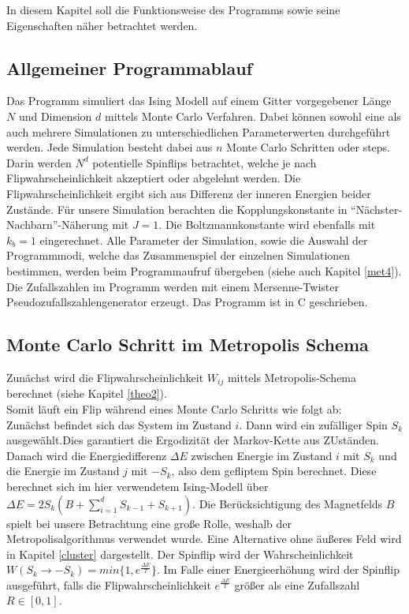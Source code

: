 
In diesem Kapitel soll die Funktionsweise des Programms sowie seine Eigenschaften näher betrachtet werden.


\subsection{Allgemeiner Programmablauf}

Das Programm simuliert das Ising Modell auf einem Gitter vorgegebener Länge $N$ und Dimension $d$ mittels Monte Carlo Verfahren. Dabei können sowohl eine als auch mehrere Simulationen zu unterschiedlichen Parameterwerten durchgeführt werden. Jede Simulation besteht dabei aus $n$ Monte Carlo Schritten oder steps. Darin werden $N^{d}$ potentielle Spinflips betrachtet, welche je nach Flipwahrscheinlichkeit akzeptiert oder abgelehnt werden. Die Flipwahrscheinlichkeit ergibt sich aus Differenz der inneren Energien beider Zustände. Für unsere Simulation berachten die Kopplungskonstante in “Nächster-Nachbarn”-Näherung mit $J=1$. Die Boltzmannkonstante wird ebenfalls mit $k_{b}=1$ eingerechnet. 
Alle Parameter der Simulation, sowie die Auswahl der Programmmodi, welche das Zusammenspiel der einzelnen Simulationen bestimmen, werden beim Programmaufruf übergeben (siehe auch Kapitel \ref{met4}). Die Zufallszahlen im Programm werden mit einem Mersenne-Twister Pseudozufallszahlengenerator erzeugt. Das Programm ist in C geschrieben.


\subsection{Monte Carlo Schritt im Metropolis Schema}

Zunächst wird die Flipwahrscheinlichkeit $W_{ij}$ mittels Metropolis-Schema berechnet (siehe Kapitel \ref{theo2}).\\
Somit läuft ein Flip während eines Monte Carlo Schritts wie folgt ab:\\
Zunächst befindet sich das System im Zustand $i$. Dann wird ein zufälliger Spin $S_{k}$ ausgewählt.Dies garantiert die Ergodizität der Markov-Kette aus ZUständen. Danach wird die Energiedifferenz $\Delta E$ zwischen Energie im Zustand $i$ mit $S_{k}$ und die Energie im Zustand $j$ mit $-S_{k}$, also dem gefliptem Spin berechnet. Diese berechnet sich im hier verwendetem Ising-Modell über $\Delta E=2S_{k}(B+\sum_{i=1}^{d}S_{k-1}+S_{k+1})$. Die Berücksichtigung des Magnetfelds $B$ spielt bei unsere Betrachtung eine große Rolle, weshalb der Metropolisalgorithmus verwendet wurde. Eine Alternative ohne äußeres Feld wird in Kapitel \ref{cluster} dargestellt. Der Spinflip wird der Wahrscheinlichkeit $W(S_k \rightarrow -S_k)=min\{ 1, e^{\frac{\Delta E}{T}} \}$. Im Falle einer Energieerhöhung wird der Spinflip ausgeführt, falls die Flipwahrscheinlichkeit $e^{\frac{\Delta E}{T}}$ größer als eine Zufallszahl $R\in[0,1]$.


